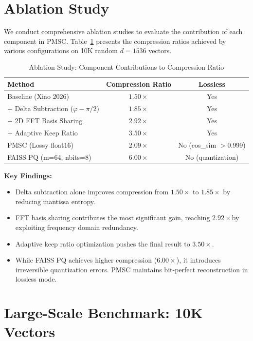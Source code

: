 \documentclass[11pt,a4paper]{article}
\begin{document}
\section{Ablation Study}
\label{sec:ablation}

We conduct comprehensive ablation studies to evaluate the contribution of each component in PMSC. Table~\ref{tab:ablation} presents the compression ratios achieved by various configurations on 10K random $d=1536$ vectors.

\begin{table}[h]
\centering
\caption{Ablation Study: Component Contributions to Compression Ratio}
\label{tab:ablation}
\begin{tabular}{lcc}
\toprule
\textbf{Method} & \textbf{Compression Ratio} & \textbf{Lossless} \\
\midrule
Baseline (Xiao 2026) & $1.50\times$ & Yes \\
+ Delta Subtraction ($\varphi - \pi/2$) & $1.85\times$ & Yes \\
+ 2D FFT Basis Sharing & $2.92\times$ & Yes \\
+ Adaptive Keep Ratio & $3.50\times$ & Yes \\
\midrule
PMSC (Lossy float16) & $2.09\times$ & No (cos\_sim $>$0.999) \\
FAISS PQ (m=64, nbits=8) & $6.00\times$ & No (quantization) \\
\bottomrule
\end{tabular}
\end{table}

\textbf{Key Findings:}
\begin{itemize}
\item Delta subtraction alone improves compression from $1.50\times$ to $1.85\times$ by reducing mantissa entropy.
\item FFT basis sharing contributes the most significant gain, reaching $2.92\times$by exploiting frequency domain redundancy.
\item Adaptive keep ratio optimization pushes the final result to $3.50\times$.
\item While FAISS PQ achieves higher compression ($6.00\times$), it introduces irreversible quantization errors. PMSC maintains bit-perfect reconstruction in lossless mode.
\end{itemize}

\section{Large-Scale Benchmark: 10K Vectors}
\label{sec:10k}
\end{document}
